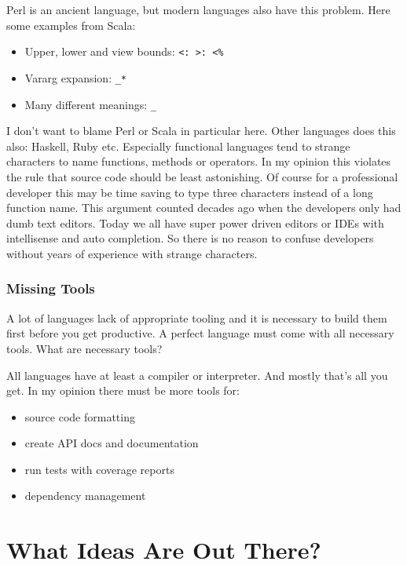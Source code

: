 \documentclass[a4paper,12pt]{article}
\begin{document}
Perl is an ancient language, but modern languages also have this problem. Here some examples from Scala\cite{special-operators-scala}:

\begin{itemize}
    \item Upper, lower and view bounds: \verb|<: >: <%|
    \item Vararg expansion: \verb|_*|
    \item Many different meanings: \verb|_|
\end{itemize}

I don't want to blame Perl or Scala in particular here. Other languages does this also: Haskell, Ruby etc. Especially functional languages tend to strange characters to name functions, methods or operators. In my opinion this violates the rule that source code should be least astonishing. Of course for a professional developer this may be time saving to type three characters instead of a long function name. This argument counted decades ago when the developers only had dumb text editors. Today we all have super power driven editors or IDEs with intellisense and auto completion. So there is no reason to confuse developers without years of experience with strange characters.

\subsubsection{Missing Tools}

A lot of languages lack of appropriate tooling and it is necessary to build them first before you get productive. A perfect language must come with all necessary tools. What are necessary tools?

All languages have at least a compiler or interpreter. And mostly that's all you get. In my opinion there must be more tools for:

\begin{itemize}
    \item source code formatting
    \item create API docs and documentation
    \item run tests with coverage reports
    \item dependency management
\end{itemize}

\section{What Ideas Are Out There?}
\end{document}

